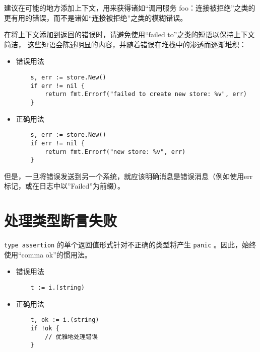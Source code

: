 建议在可能的地方添加上下文，用来获得诸如“调用服务 foo：连接被拒绝”之类的更有用的错误，而不是诸如“连接被拒绝”之类的模糊错误。

在将上下文添加到返回的错误时，请避免使用“failed to”之类的短语以保持上下文简洁，
这些短语会陈述明显的内容，并随着错误在堆栈中的渗透而逐渐堆积：
\begin{itemize}[leftmargin=4em]
\item 错误用法

  \begin{verbatim}
    s, err := store.New()
    if err != nil {
    	return fmt.Errorf("failed to create new store: %v", err)
    }
  \end{verbatim}
\item 正确用法

  \begin{verbatim}
    s, err := store.New()
    if err != nil {
    	return fmt.Errorf("new store: %v", err)
    }
  \end{verbatim}
\end{itemize}

但是，一旦将错误发送到另一个系统，就应该明确消息是错误消息（例如使用err标记，或在日志中以”Failed”为前缀）。

\section{处理类型断言失败}
\texttt{type assertion} 的单个返回值形式针对不正确的类型将产生 \texttt{panic} 。因此，始终使用“comma ok”的惯用法。
\begin{itemize}[leftmargin=4em]
\item 错误用法

  \begin{verbatim}
    t := i.(string)
  \end{verbatim}
\item 正确用法

  \begin{verbatim}
    t, ok := i.(string)
    if !ok {
    	// 优雅地处理错误
    }
  \end{verbatim}
\end{itemize}
